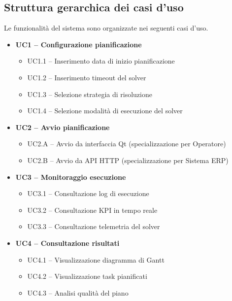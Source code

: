 \subsection{Struttura gerarchica dei casi d'uso}

Le funzionalità del sistema sono organizzate nei seguenti casi d'uso.

\begin{itemize}
    \item \textbf{UC1 -- Configurazione pianificazione}
    \begin{itemize}
        \item UC1.1 -- Inserimento data di inizio pianificazione
        \item UC1.2 -- Inserimento timeout del solver
        \item UC1.3 -- Selezione strategia di risoluzione
        \item UC1.4 -- Selezione modalità di esecuzione del solver
    \end{itemize}

    \item \textbf{UC2 -- Avvio pianificazione}
    \begin{itemize}
        \item UC2.A -- Avvio da interfaccia Qt (specializzazione per Operatore)
        \item UC2.B -- Avvio da API HTTP (specializzazione per Sistema ERP)
    \end{itemize}

    \item \textbf{UC3 -- Monitoraggio esecuzione}
    \begin{itemize}
        \item UC3.1 -- Consultazione log di esecuzione
        \item UC3.2 -- Consultazione KPI in tempo reale
        \item UC3.3 -- Consultazione telemetria del solver
    \end{itemize}

    \item \textbf{UC4 -- Consultazione risultati}
    \begin{itemize}
        \item UC4.1 -- Visualizzazione diagramma di Gantt
        \item UC4.2 -- Visualizzazione task pianificati
        \item UC4.3 -- Analisi qualità del piano
    \end{itemize}


\end{itemize}
